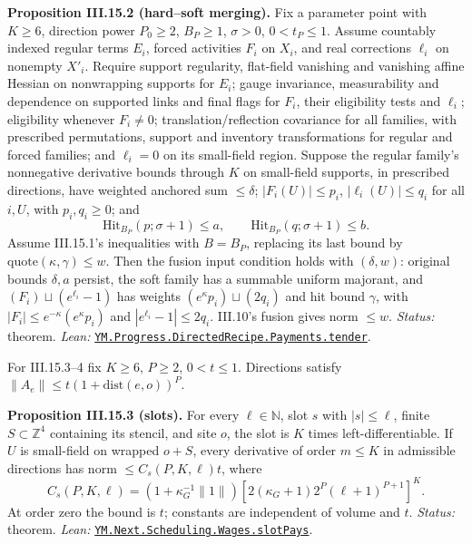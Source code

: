 \documentclass[
  letterpaper,
  11pt]{article}
\newcounter{none} %
\begin{document}
\textbf{Proposition III.15.2 (hard--soft merging).} Fix a parameter
point with \(K\ge6\), direction power \(P_0\ge2\), \(B_P\ge1\),
\(\sigma>0\), \(0<t_P\le1\). Assume countably indexed regular terms
\(E_i\), forced activities \(F_i\) on \(X_i\), and real corrections
\(\ell_i\) on nonempty \(X'_i\). Require support regularity, flat-field
vanishing and vanishing affine Hessian on nonwrapping supports for
\(E_i\); gauge invariance, measurability and dependence on supported
links and final flags for \(F_i\), their eligibility tests and
\(\ell_i\); eligibility whenever \(F_i\ne0\); translation/reflection
covariance for all families, with prescribed permutations, support and
inventory transformations for regular and forced families; and
\(\ell_i=0\) on its small-field region. Suppose the regular family's
nonnegative derivative bounds through \(K\) on small-field supports, in
prescribed directions, have weighted anchored sum \(\le\delta\);
\(|F_i(U)|\le p_i\), \(|\ell_i(U)|\le q_i\) for all \(i,U\), with
\(p_i,q_i\ge0\); and
\[\mathrm{Hit}_{B_P}(p;\sigma+1)\le a,\qquad\mathrm{Hit}_{B_P}(q;\sigma+1)\le b.\]
Assume III.15.1's inequalities with \(B=B_P\), replacing its last bound
by \(\mathrm{quote}(\kappa,\gamma)\le w\). Then the fusion input
condition holds with \((\delta,w)\): original bounds \(\delta,a\)
persist, the soft family has a summable uniform majorant, and
\((F_i)\sqcup(e^{\ell_i}-1)\) has weights \((e^\kappa p_i)\sqcup(2q_i)\)
and hit bound \(\gamma\), with \(|F_i|\le e^{-\kappa}(e^\kappa p_i)\)
and \(|e^{\ell_i}-1|\le2q_i\). III.10's fusion gives norm \(\le w\).
\emph{Status:} theorem. \emph{Lean:}
\href{https://github.com/yang-mills-group/OpenAI-YM-20261028/blob/3456e5e75cf8d4cd558955a5c7638fba2d68f464/YM/Progress/DIRECTED_RECIPE/Tender.lean\#L124-L133}{\texttt{YM.Progress.DirectedRecipe.Payments.tender}}.

For III.15.3--4 fix \(K\ge6\), \(P\ge2\), \(0<t\le1\). Directions
satisfy \(\|A_e\|\le t(1+\mathrm{dist}(e,o))^P\).

\textbf{Proposition III.15.3 (slots).} For every \(\ell\in\mathbb N\),
slot \(s\) with \(|s|\le\ell\), finite \(S\subset\mathbb Z^4\)
containing its stencil, and site \(o\), the slot is \(K\) times
left-differentiable. If \(U\) is small-field on wrapped \(o+S\), every
derivative of order \(m\le K\) in admissible directions has norm
\(\le C_s(P,K,\ell)t\), where
\[C_s(P,K,\ell)=(1+\kappa_G^{-1}\|1\|)[2(\kappa_G+1)2^P(\ell+1)^{P+1}]^K.\]
At order zero the bound is \(t\); constants are independent of volume
and \(t\). \emph{Status:} theorem. \emph{Lean:}
\href{https://github.com/yang-mills-group/OpenAI-YM-20261028/blob/3456e5e75cf8d4cd558955a5c7638fba2d68f464/YM/Next/SCHEDULE/SlotPay.lean\#L108-L159}{\texttt{YM.Next.Scheduling.Wages.slotPays}}.
\end{document}
